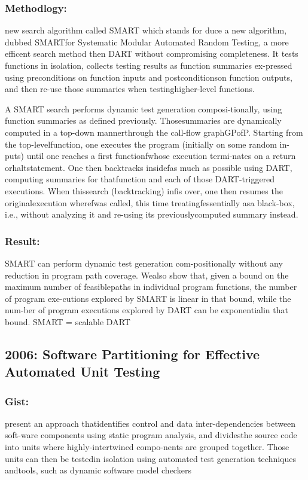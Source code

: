 \documentclass[	runningheads,
				a4paper]{llncs}
\begin{document}
\subsubsection{Methodlogy:}
new search algorithm called SMART which stands for duce a new algorithm, dubbed SMARTfor Systematic Modular Automated Random Testing, a more efficent search method then DART without compromising
completeness. It tests functions in isolation, collects testing results as function summaries ex-pressed using preconditions on function inputs and postconditionson function outputs, and then re-use those summaries when testinghigher-level functions.

A SMART search performs dynamic test generation composi-tionally,  using  function  summaries  as  defined  previously.  Thosesummaries  are  dynamically  computed  in  a  top-down  mannerthrough the call-flow graphGPofP. Starting from the top-levelfunction, one executes the program (initially on some random in-puts) until one  reaches  a first functionfwhose execution termi-nates on a return orhaltstatement. One then backtracks insidefas much as  possible  using DART, computing summaries  for thatfunction and each of those DART-triggered executions. When thissearch (backtracking)  infis over, one then resumes the originalexecution wherefwas called,  this time treatingfessentially asa black-box,  i.e., without analyzing it and re-using its previouslycomputed  summary  instead. 

\subsubsection{Result:}
SMART can perform dynamic test generation com-positionally without any reduction in program path coverage. Wealso show that, given a bound on the maximum number of feasiblepaths in individual program functions, the number of program exe-cutions explored by SMART is linear in that bound, while the num-ber of program executions explored by DART can be exponentialin that bound.
SMART = scalable DART


\subsection{2006: Software Partitioning for Effective Automated Unit Testing}
\cite{chakrabarti2006software}

\subsubsection{Gist:}
present an approach thatidentifies control and data inter-dependencies between soft-ware components using static program analysis, and dividesthe source code into units where highly-intertwined compo-nents are grouped together. Those units can then be testedin isolation using automated test generation techniques andtools,  such as dynamic software model checkers
\end{document}
